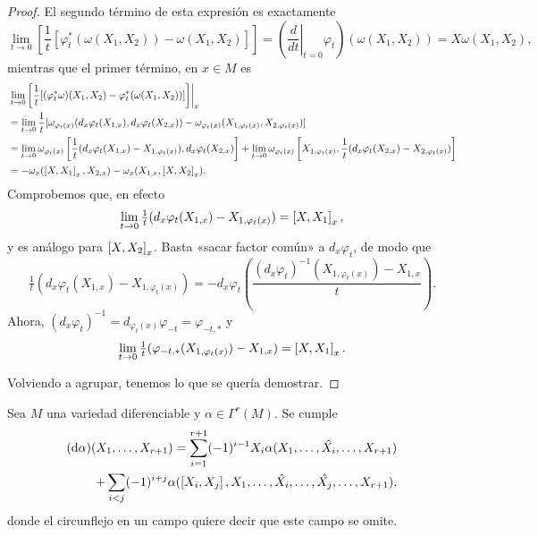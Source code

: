 \begin{proof}
  El segundo término de esta expresión es exactamente
  \begin{equation*}
    \lim_{t\rightarrow 0}\left[\frac{1}{t}[\varphi_t^*(\omega(X_1,X_2))-\omega(X_1,X_2)]\right]=\left( \left. \frac{d}{dt}\right|_{t=0} \varphi_t \right)(\omega(X_1,X_2))=X\omega(X_1,X_2),
  \end{equation*}
  mientras que el primer término, en $x\in M$ es
  \begin{align*}
     & \left.\lim_{t\rightarrow 0}\left[\frac{1}{t}[(\varphi_t^* \omega)(X_1,X_2) - \varphi_t^*(\omega(X_1,X_2))]\right]\right|_{x}  \\
     & = \lim_{t \rightarrow 0}\frac{1}{t}[\omega_{\varphi_t(x)}(d_x \varphi_t(X_{1,x}),d_x \varphi_t(X_{2,x})) -\omega_{\varphi_t(x)}(X_{1,\varphi_t(x)},X_{2,\varphi_t(x)})] \\
     & = \lim_{t\rightarrow 0} \omega_{\varphi_t(x)}\left[\frac{1}{t}(d_x \varphi_t(X_{1,x})-X_{1,\varphi_t(x)}),d_x\varphi_t(X_{2,x})\right] + \lim_{t\rightarrow 0} \omega_{\varphi_t(x)}\left[ X_{1,\varphi_t (x)}, \frac{1}{t}(d_x \varphi_t (X_{2,x})-X_{2,\varphi_t(x)}) \right] \\
     & = -\omega_x(\left[X,X_1\right]_x,X_{2,x})-\omega_x(X_{1,x},\left[X,X_2\right]_x).
  \end{align*}
  Comprobemos que, en efecto
  \begin{equation*}
    \lim_{t\rightarrow 0}\tfrac{1}{t}(d_x\varphi_t(X_{1,x})-X_{1,\varphi_t(x)})=\left[X,X_1\right]_x,
  \end{equation*}
  y es análogo para $\left[X,X_2\right]_x$.
  Basta «sacar factor común» a $d_x\varphi_t$, de modo que
  \begin{equation*}
    \tfrac{1}{t}(d_x\varphi_t(X_{1,x})-X_{1,\varphi_t(x)})=-d_x\varphi_t\left( \frac{\left( d_x\varphi_t \right)^{-1}\left( X_{1,\varphi_t(x)} \right)-X_{1,x}}{t} \right).
  \end{equation*}
  Ahora, $(d_x\varphi_t)^{-1}=d_{\varphi_t(x)}\varphi_{-t}=\varphi_{-t,*}$ y 
  \begin{equation*}
    \lim_{t\rightarrow 0} \tfrac{1}{t}(\varphi_{-t,*}(X_{1,\varphi_t(x)})-X_{1,x})=\left[X,X_1\right]_x.
  \end{equation*}

  Volviendo a agrupar, tenemos lo que se quería demostrar.
\end{proof}
\begin{prop}
  Sea $M$ una variedad diferenciable y $\alpha \in \Gamma^r(M)$. Se cumple
  \begin{align*}
    (\mathrm{d} \alpha)(X_1,\dots,X_{r+1})=\sum_{i=1}^{r+1}(-1)^{i-1}X_i \alpha (X_1,\dots,\hat{X_i},\dots,X_{r+1}) \\
    + \sum_{i<j}(-1)^{i+j}\alpha(\left[X_i,X_j\right],X_1,\dots,\hat{X_i},\dots,\hat{X_j},\dots,X_{r+1}),
  \end{align*}
  donde el circunflejo en un campo quiere decir que este campo se omite.
\end{prop}
